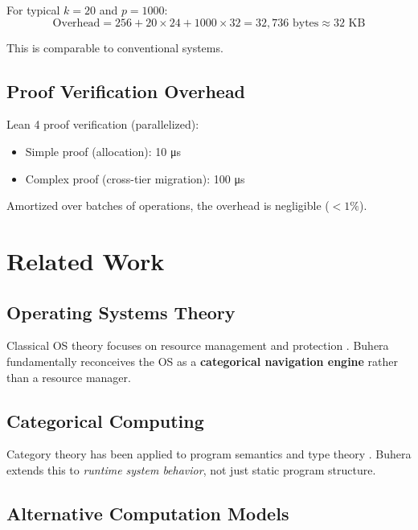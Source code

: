 \documentclass[twocolumn,10pt]{article}
\theoremstyle{definition}
\theoremstyle{remark}
\begin{document}
For typical $k = 20$ and $p = 1000$:
\begin{equation}
    \text{Overhead} = 256 + 20 \times 24 + 1000 \times 32 = 32,736 \text{ bytes} \approx 32 \text{ KB}
\end{equation}

This is comparable to conventional systems.

\subsection{Proof Verification Overhead}

Lean 4 proof verification (parallelized):
\begin{itemize}
    \item Simple proof (allocation): 10 μs
    \item Complex proof (cross-tier migration): 100 μs
\end{itemize}

Amortized over batches of operations, the overhead is negligible ($<1\%$).

\section{Related Work}
\label{sec:related}

\subsection{Operating Systems Theory}

Classical OS theory focuses on resource management and protection \citep{tanenbaum2014modern,silberschatz2018operating}. Buhera fundamentally reconceives the OS as a \textbf{categorical navigation engine} rather than a resource manager.

\subsection{Categorical Computing}

Category theory has been applied to program semantics \citep{barr1990category} and type theory \citep{awodey2010category}. Buhera extends this to \emph{runtime system behavior}, not just static program structure.

\subsection{Alternative Computation Models}
\end{document}
